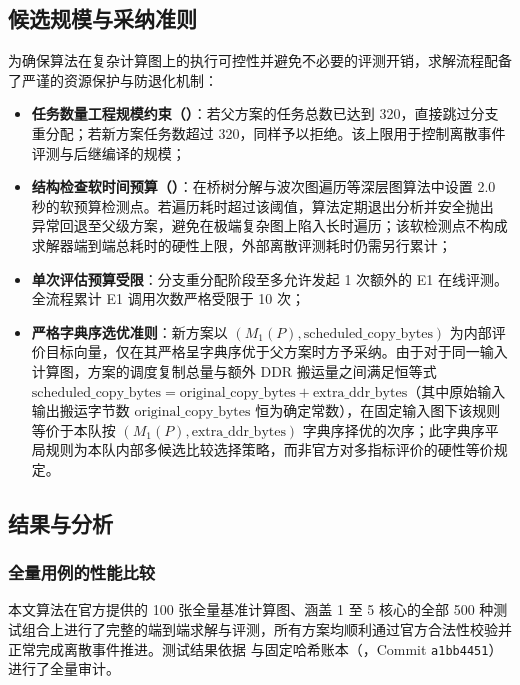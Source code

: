 \documentclass[anonymous,withtoc]{gmcm2026}
\providecommand{\tightlist}{\setlength{\itemsep}{0pt}\setlength{\parskip}{0pt}}
\begin{document}
\subsection{候选规模与采纳准则}

为确保算法在复杂计算图上的执行可控性并避免不必要的评测开销，求解流程配备了严谨的资源保护与防退化机制：

\begin{itemize}
\tightlist
\item
  \textbf{任务数量工程规模约束（\texttt{}）}：若父方案的任务总数已达到 320，直接跳过分支重分配；若新方案任务数超过 320，同样予以拒绝。该上限用于控制离散事件评测与后继编译的规模；
\item
  \textbf{结构检查软时间预算（\texttt{}）}：在桥树分解与波次图遍历等深层图算法中设置 2.0 秒的软预算检测点。若遍历耗时超过该阈值，算法定期退出分析并安全抛出 \texttt{} 异常回退至父级方案，避免在极端复杂图上陷入长时遍历；该软检测点不构成求解器端到端总耗时的硬性上限，外部离散评测耗时仍需另行累计；
\item
  \textbf{单次评估预算受限}：分支重分配阶段至多允许发起 1 次额外的 E1 在线评测。全流程累计 E1 调用次数严格受限于 10 次；
\item
  \textbf{严格字典序选优准则}：新方案以 \((M_1(P), \text{scheduled\_copy\_bytes})\) 为内部评价目标向量，仅在其严格呈字典序优于父方案时方予采纳。由于对于同一输入计算图，方案的调度复制总量与额外 DDR 搬运量之间满足恒等式 \(\text{scheduled\_copy\_bytes} = \text{original\_copy\_bytes} + \text{extra\_ddr\_bytes}\)（其中原始输入输出搬运字节数 \(\text{original\_copy\_bytes}\) 恒为确定常数），在固定输入图下该规则等价于本队按 \((M_1(P), \text{extra\_ddr\_bytes})\) 字典序择优的次序；此字典序平局规则为本队内部多候选比较选择策略，而非官方对多指标评价的硬性等价规定。
\end{itemize}

\subsection{结果与分析}

\subsubsection{全量用例的性能比较}

本文算法在官方提供的 100 张全量基准计算图、涵盖 1 至 5 核心的全部 500 种测试组合上进行了完整的端到端求解与评测，所有方案均顺利通过官方合法性校验并正常完成离散事件推进。测试结果依据 \texttt{} 与固定哈希账本（\texttt{}，Commit \texttt{a1bb4451}）进行了全量审计。
\end{document}
